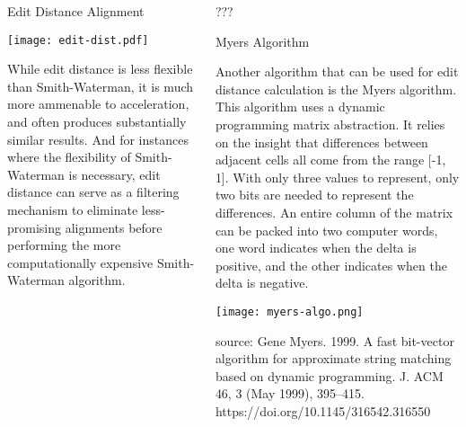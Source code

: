 \documentclass{cbxposter}
\renewcommand{\smallskip}{\vspace{0.16667in}}
\begin{document}
\begin{frame}[fragile,t]{}
\begin{columns}[T]
\begin{column}{10.5in}
\begin{block}{Edit Distance Alignment}
  \begin{center}
    \texttt{[image: edit-dist.pdf]}
  \end{center}

  While edit distance is less flexible than Smith-Waterman, it is much more
  ammenable to acceleration, and often produces substantially similar results.
  And for instances where the flexibility of Smith-Waterman is necessary, edit
  distance can serve as a filtering mechanism to eliminate less-promising
  alignments before performing the more computationally expensive Smith-Waterman
  algorithm.

\end{block}

\end{column}


\begin{column}{10.5in}
\vspace{0.4in}


\begin{block}{???}

\end{block}

\vspace{0.67in}
\begin{block}{Myers Algorithm}
  \smallskip

  Another algorithm that can be used for edit distance calculation is the
  Myers algorithm. This algorithm uses a dynamic programming matrix abstraction.
  It relies on the insight that differences between adjacent cells all come from
  the range [-1, 1]. With only three values to represent, only two bits are needed
  to represent the differences. An entire column of the matrix can be packed into
  two computer words, one word indicates when the delta is positive, and the other
  indicates when the delta is negative.

  \begin{center}
    \texttt{[image: myers-algo.png]}
  \end{center}

  source: Gene Myers. 1999. A fast bit-vector algorithm for approximate string
  matching based on dynamic programming. J. ACM 46, 3 (May 1999),
  395–415. https://doi.org/10.1145/316542.316550

\end{block}

  
\end{column}


\end{columns}
\end{frame}
\end{document}
